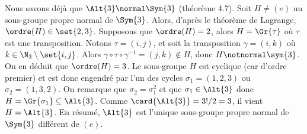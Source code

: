 Nous savons déjà que $\Alt{3}\normal\Sym{3}$ (théorème 4.7).  Soit $H\neq (e)$
un sous-groupe propre normal de $\Sym{3}$. Alors, d'après le théorème de
Lagrange, $\ordre(H)\in\set{2,3}$.  Supposons que $\ordre(H) = 2$, alors 
$H = \Gr{\tau}$ où $\tau$ est une transposition.  Notons $\tau = (i,j)$, et 
soit la transposition $\gamma = (i,k)$ où $k\in\N_3\setminus\set{i,j}$.  Alors
$\gamma\circ\tau\circ\gamma^{-1} = (j,k) \notin H$, donc $H\notnormal\sym{3}$.
On en déduit que $\ordre(H) = 3$.  Le sous-groupe $H$ est cyclique (car d'ordre
premier) et est donc engendré par l'un des cycles $\sigma_1 = (1,2,3)$ ou
$\sigma_2 = (1,3,2)$. On remarque que $\sigma_2 = \sigma_1^2$ et que
$\sigma_1\in\Alt{3}$ donc $H = \Gr{\sigma_1}\subseteq\Alt{3}$. Comme
$\card{\Alt{3}} = 3!/2 = 3$, il vient $H = \Alt{3}$. En résumé, $\Alt{3}$ est
l'unique sous-groupe propre normal de $\Sym{3}$ différent de $(e)$.
